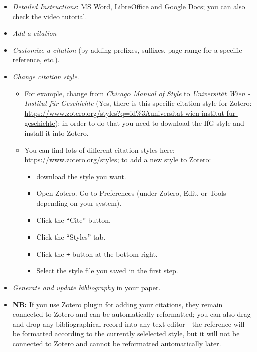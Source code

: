 \documentclass[
]{book}
\providecommand{\tightlist}{%
  \setlength{\itemsep}{0pt}\setlength{\parskip}{0pt}}
\begin{document}
\begin{itemize}
\tightlist
\item
  \emph{Detailed Instructions}: \href{https://www.zotero.org/support/word_processor_plugin_usage}{MS Word}, \href{https://www.zotero.org/support/libreoffice_writer_plugin_usage}{LibreOffice} and \href{https://www.zotero.org/support/google_docs}{Google Docs}; you can also check the video tutorial.
\item
  \emph{Add a citation}
\item
  \emph{Customize a citation} (by adding prefixes, suffixes, page range for a specific reference, etc.).
\item
  \emph{Change citation style}.

  \begin{itemize}
  \tightlist
  \item
    For example, change from \emph{Chicago Manual of Style} to \emph{Universität Wien - Institut für Geschichte} (Yes, there is this specific citation style for Zotero: \url{https://www.zotero.org/styles?q=id\%3Auniversitat-wien-institut-fur-geschichte}); in order to do that you need to download the IfG style and install it into Zotero.
  \item
    You can find lots of different citation styles here: \url{https://www.zotero.org/styles}; to add a new style to Zotero:

    \begin{itemize}
    \tightlist
    \item
      download the style you want.
    \item
      Open Zotero. Go to Preferences (under Zotero, Edit, or Tools --- depending on your system).
    \item
      Click the ``Cite'' button.
    \item
      Click the ``Styles'' tab.
    \item
      Click the \texttt{+} button at the bottom right.
    \item
      Select the style file you saved in the first step.
    \end{itemize}
  \end{itemize}
\item
  \emph{Generate and update bibliography} in your paper.
\item
  \textbf{NB:} If you use Zotero plugin for adding your citations, they remain connected to Zotero and can be automatically reformatted; you can also drag-and-drop any bibliographical record into any text editor---the reference will be formatted according to the currently selelected style, but it will not be connected to Zotero and cannot be reformatted automatically later.
\end{itemize}
\end{document}
